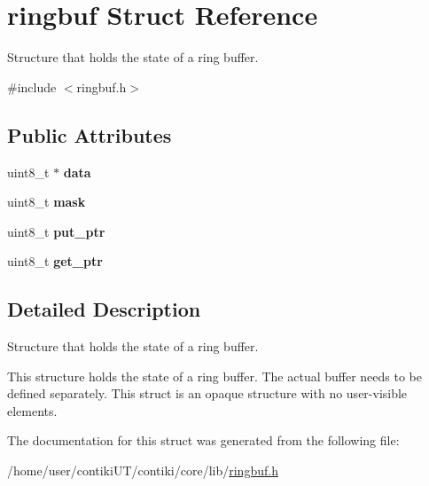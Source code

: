\hypertarget{structringbuf}{}\section{ringbuf Struct Reference}
\label{structringbuf}


Structure that holds the state of a ring buffer.  




{\ttfamily \#include $<$ringbuf.\+h$>$}

\subsection*{Public Attributes}
\begin{DoxyCompactItemize}
\item 
\hypertarget{structringbuf_ae1472129ec96ef39782f87836fb670da}{}uint8\+\_\+t $\ast$ {\bfseries data}\label{structringbuf_ae1472129ec96ef39782f87836fb670da}

\item 
\hypertarget{structringbuf_a78d6347a4464086fdbae6258c1e603c4}{}uint8\+\_\+t {\bfseries mask}\label{structringbuf_a78d6347a4464086fdbae6258c1e603c4}

\item 
\hypertarget{structringbuf_ad8ed0f67d2d85a7707d271ae9386dcf8}{}uint8\+\_\+t {\bfseries put\+\_\+ptr}\label{structringbuf_ad8ed0f67d2d85a7707d271ae9386dcf8}

\item 
\hypertarget{structringbuf_af4b195d1d47a3190deb1d646e9a04528}{}uint8\+\_\+t {\bfseries get\+\_\+ptr}\label{structringbuf_af4b195d1d47a3190deb1d646e9a04528}

\end{DoxyCompactItemize}


\subsection{Detailed Description}
Structure that holds the state of a ring buffer. 

This structure holds the state of a ring buffer. The actual buffer needs to be defined separately. This struct is an opaque structure with no user-\/visible elements. 

The documentation for this struct was generated from the following file\+:\begin{DoxyCompactItemize}
\item 
/home/user/contiki\+U\+T/contiki/core/lib/\hyperlink{ringbuf_8h}{ringbuf.\+h}\end{DoxyCompactItemize}
